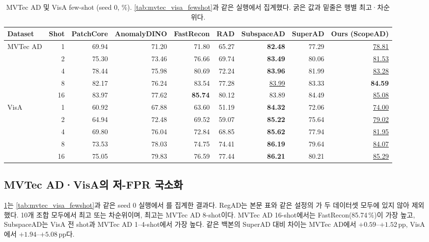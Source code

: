 \clearpage
\begin{table}[!t]
\centering\scriptsize\setlength{\tabcolsep}{6pt}
\caption{MVTec AD 및 VisA few-shot \AUPRO{} (seed 0, \%). \cref{tab:mvtec_visa_fewshot}과 같은 실행에서 집계했다. 굵은 값과 밑줄은 행별 최고·차순위다.}
\label{tab:mvtec_visa_aupro}
\begin{tabular}{l r r r r r r r r}
\toprule
Dataset & Shot & PatchCore & AnomalyDINO & FastRecon & RAD & SubspaceAD & SuperAD & Ours (ScopeAD) \\
\midrule
MVTec AD & 1 & 69.94 & 71.20 & 71.80 & 65.27 & \textbf{82.48} & 77.29 & \underline{78.81} \\
         & 2 & 75.30 & 73.46 & 76.66 & 69.74 & \textbf{83.49} & 80.06 & \underline{81.53} \\
         & 4 & 78.44 & 75.98 & 80.69 & 72.24 & \textbf{83.96} & 81.99 & \underline{83.28} \\
         & 8 & 82.17 & 76.24 & 83.54 & 77.28 & \underline{83.99} & 83.33 & \textbf{84.59} \\
         & 16 & 83.97 & 77.62 & \textbf{85.74} & 80.12 & 83.89 & 84.49 & \underline{85.08} \\
\midrule
VisA     & 1 & 60.92 & 67.88 & 63.60 & 51.19 & \textbf{84.32} & 72.06 & \underline{74.00} \\
         & 2 & 64.94 & 72.48 & 69.52 & 59.07 & \textbf{85.22} & 75.64 & \underline{79.02} \\
         & 4 & 69.80 & 76.04 & 72.84 & 68.85 & \textbf{85.62} & 77.94 & \underline{81.95} \\
         & 8 & 73.53 & 78.03 & 74.75 & 74.41 & \textbf{86.19} & 79.64 & \underline{84.07} \\
         & 16 & 75.05 & 79.83 & 76.59 & 77.44 & \textbf{86.21} & 80.21 & \underline{85.29} \\
\bottomrule
\end{tabular}
\end{table}

\subsection{MVTec AD·VisA의 저-FPR 국소화}
\label{sec:appendix:standard-aupro}
\cref{tab:mvtec_visa_aupro}는 \cref{tab:mvtec_visa_fewshot}과 같은 seed 0 실행에서 \AUPRO{}를 집계한 결과다. RegAD는 본문 표와 같은 설정의 \AUPRO{}가 두 데이터셋 모두에 있지 않아 제외했다.
 10개 조합 모두에서 최고 또는 차순위이며, 최고는 MVTec AD 8-shot이다. MVTec AD 16-shot에서는 FastRecon(85.74\,\%)이 가장 높고, SubspaceAD는 VisA 전 shot과 MVTec AD 1--4-shot에서 가장 높다.
같은 백본의 SuperAD 대비 차이는 MVTec AD에서 $+0.59$--$+1.52$\,pp, VisA에서 $+1.94$--$+5.08$\,pp다.



\FloatBarrier
